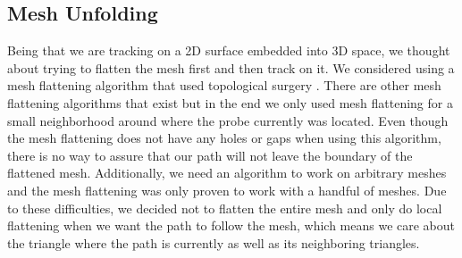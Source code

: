 \subsection{Mesh Unfolding}

Being that we are tracking on a 2D surface embedded into 3D space, we thought about trying to flatten the mesh first and then track on it. We considered using a mesh flattening algorithm that used topological surgery \cite{meshunfolding}. There are other mesh flattening algorithms that exist but in the end we only used mesh flattening for a small neighborhood around where the probe currently was located. Even though the mesh flattening does not have any holes or gaps when using this algorithm, there is no way to assure that our path will not leave the boundary of the flattened mesh. Additionally, we need an algorithm to work on arbitrary meshes and the mesh flattening was only proven to work with a handful of meshes. Due to these difficulties, we decided not to flatten the entire mesh and only do local flattening when we want the path to follow the mesh, which means we care about the triangle where the path is currently as well as its neighboring triangles. 